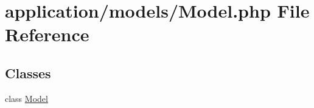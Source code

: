 \hypertarget{_model_8php}{\section{application/models/\-Model.php File Reference}
\label{_model_8php}
}
\subsection*{Classes}
\begin{DoxyCompactItemize}
\item 
class \hyperlink{class_model}{Model}
\end{DoxyCompactItemize}
